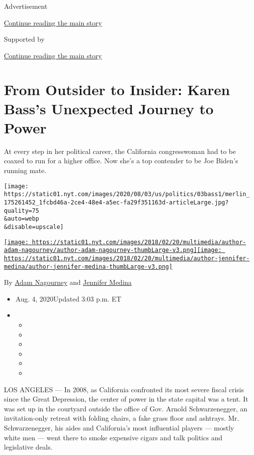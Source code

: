 Advertisement

\protect\hyperlink{after-top}{Continue reading the main story}

Supported by

\protect\hyperlink{after-sponsor}{Continue reading the main story}

\hypertarget{from-outsider-to-insider-karen-basss-unexpected-journey-to-power}{%
\section{From Outsider to Insider: Karen Bass's Unexpected Journey to
Power}\label{from-outsider-to-insider-karen-basss-unexpected-journey-to-power}}

At every step in her political career, the California congresswoman had
to be coaxed to run for a higher office. Now she's a top contender to be
Joe Biden's running mate.

\texttt{[image: https://static01.nyt.com/images/2020/08/03/us/politics/03bass1/merlin\_175261452\_1fcbd46a-2ce4-48e4-a5ec-fa29f351163d-articleLarge.jpg?quality=75\\\&auto=webp\\\&disable=upscale]}

\href{https://www.nytimes.com/by/adam-nagourney}{\texttt{[image: https://static01.nyt.com/images/2018/02/20/multimedia/author-adam-nagourney/author-adam-nagourney-thumbLarge-v3.png]}}\href{https://www.nytimes.com/by/jennifer-medina}{\texttt{[image: https://static01.nyt.com/images/2018/02/20/multimedia/author-jennifer-medina/author-jennifer-medina-thumbLarge-v3.png]}}

By \href{https://www.nytimes.com/by/adam-nagourney}{Adam Nagourney} and
\href{https://www.nytimes.com/by/jennifer-medina}{Jennifer Medina}

\begin{itemize}
\item
  Aug. 4, 2020Updated 3:03 p.m. ET
\item
  \begin{itemize}
  \item
  \item
  \item
  \item
  \item
  \item
  \end{itemize}
\end{itemize}

LOS ANGELES --- In 2008, as California confronted its most severe fiscal
crisis since the Great Depression, the center of power in the state
capital was a tent. It was set up in the courtyard outside the office of
Gov. Arnold Schwarzenegger, an invitation-only retreat with folding
chairs, a fake grass floor and ashtrays. Mr. Schwarzenegger, his aides
and California's most influential players --- mostly white men --- went
there to smoke expensive cigars and talk politics and legislative deals.

